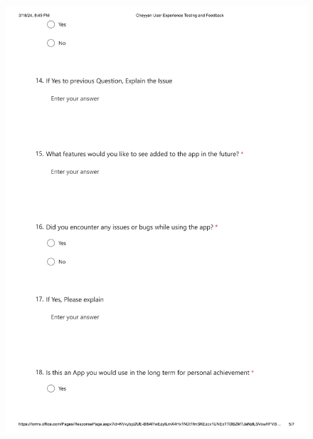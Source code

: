 \documentclass{l4proj}
\begin{document}
\begin{appendices}
\begin{figure}[h]
    \centering
    \includegraphics[height=20cm]{images/Cheyyan User Experience Testing and Feedback-5.png}
\end{figure}


\end{appendices}
\end{document}

